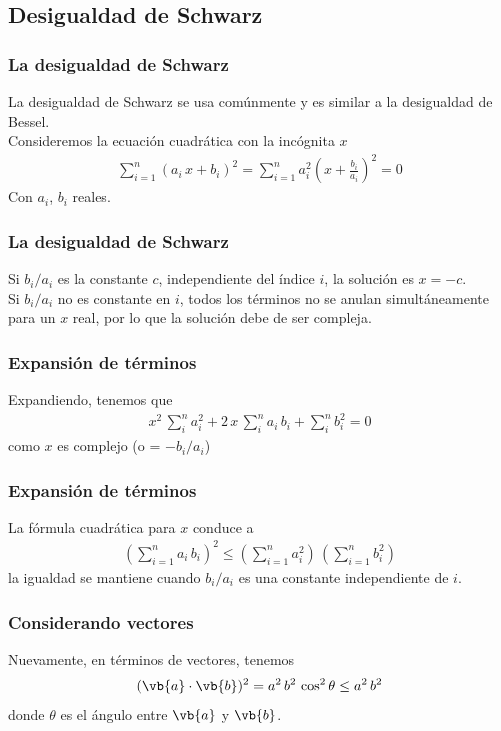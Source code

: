 \subsection{Desigualdad de Schwarz}
\begin{frame}
\frametitle{La desigualdad de Schwarz}
La desigualdad de Schwarz se usa comúnmente y es similar a la desigualdad de Bessel.
\\
\bigskip
Consideremos la ecuación cuadrática con la incógnita $x$
 \begin{align}
\sum_{i=1}^{n} (a_{i} \, x + b_{i})^{2} = \sum_{i=1}^{n} a_{i}^{2} \left( x + \frac{b_{i}}{a_{i}} \right)^{2} = 0
\label{eq:ecuacion_10_74}
\end{align}
Con $a_{i}$, $b_{i}$ reales.
\end{frame}
\begin{frame}
\frametitle{La desigualdad de Schwarz}
Si $b_{i}/a_{i}$ es la constante $c$, independiente del índice $i$, la solución es $x= - c$. 
\\
\bigskip
\pause
Si $b_{i}/a_{i}$ no es constante en $i$, todos los términos no se anulan simultáneamente para un $x$ real, por lo que la solución debe de ser compleja.
\end{frame}
\begin{frame}
\frametitle{Expansión de términos}
Expandiendo, tenemos que
\begin{align}
x^{2} \, \sum_{i}^{n} a_{i}^{2} + 2 \, x \, \sum_{i}^{n} a_{i} \, b_{i} + \sum_{i}^{n} b_{i}^{2} = 0
\label{eq:ecuacion_10_75}
\end{align}
\pause
como $x$ es complejo (o = $-b_{i}/a_{i}$)
\end{frame}
\begin{frame}
\frametitle{Expansión de términos}
La fórmula cuadrática para $x$ conduce a 
\begin{align}
\left( \sum_{i=1}^{n} a_{i} \, b_{i} \right)^{2} \leq \left( \sum_{i=1}^{n} a_{i}^{2} \right) \, \left( \sum_{i=1}^{n} b_{i}^{2} \right)
\label{eq:ecuacion_10_76}
\end{align}
la igualdad se mantiene cuando $b_{i}/a_{i}$ es una constante independiente de $i$.
\end{frame}
\begin{frame}
\frametitle{Considerando vectores}
Nuevamente, en términos de vectores, tenemos
\begin{align}
( \vb{a} \cdot \vb{b} )^{2} =  a^{2} \, b^{2} \, \cos^{2} \theta \leq a^{2} \, b^{2}
\label{eq:ecuacion_10_77}
\end{align}
donde $\theta$ es el ángulo entre $\vb{a}$ y $\vb{b}$.
\end{frame}

